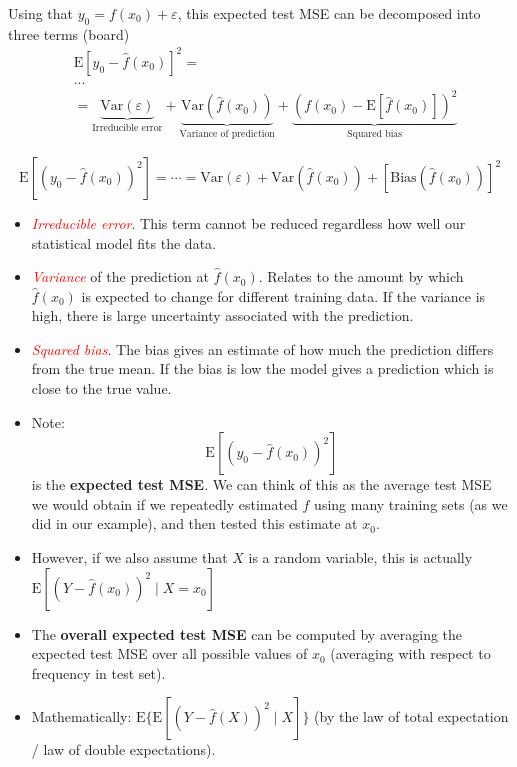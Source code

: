 \documentclass[ignorenonframetext,]{beamer}
\begin{document}
\begin{frame}

Using that \(y_0=f(x_0)+\varepsilon\), this expected test MSE can be
decomposed into three terms (board) \begin{align*}
&\text{E}[y_0 - \hat{f}(x_0)]^2 = \\
& ... \\
& =  \underbrace{\text{Var}(\varepsilon)}_{\text{Irreducible error}} + \underbrace{\text{Var}(\hat{f}(x_0))}_{\text{Variance of prediction}} + \underbrace{\left( f(x_0) - \text{E}[\hat{f}(x_0)] \right)^2}_{\text{Squared bias}}
\end{align*}

\end{frame}

\begin{frame}

\[\text{E}[(y_0 - \hat{f}(x_0))^2]=\cdots=\text{Var}(\varepsilon) +  \text{Var}(\hat{f}(x_0))+[\text{Bias}(\hat{f}(x_0))]^2\]

\begin{itemize}
\item
  \emph{\textcolor{red}{Irreducible error}}. This term cannot be reduced
  regardless how well our statistical model fits the data.
\item
  \emph{\textcolor{red}{Variance}} of the prediction at
  \(\hat{f}(x_0)\). Relates to the amount by which \(\hat{f}(x_0)\) is
  expected to change for different training data. If the variance is
  high, there is large uncertainty associated with the prediction.
\item
  \emph{\textcolor{red}{Squared bias}}. The bias gives an estimate of
  how much the prediction differs from the true mean. If the bias is low
  the model gives a prediction which is close to the true value.
\end{itemize}

\end{frame}

\begin{frame}

\begin{itemize}
\item
  Note: \[\text{E}[(y_0 - \hat{f}(x_0))^2]\] is the \textbf{expected
  test MSE}. We can think of this as the average test MSE we would
  obtain if we repeatedly estimated \(f\) using many training sets (as
  we did in our example), and then tested this estimate at \(x_0\).
\item
  However, if we also assume that \(X\) is a random variable, this is
  actually \(\text{E}[(Y - \hat{f}(x_0))^2 \mid X=x_0]\)
\item
  The \textbf{overall expected test MSE} can be computed by averaging
  the expected test MSE over all possible values of \(x_0\) (averaging
  with respect to frequency in test set).
\item
  Mathematically: \(\text{E} \{ \text{E}[(Y - \hat{f}(X))^2 \mid X]\}\)
  (by the law of total expectation / law of double expectations).
\end{itemize}

\end{frame}
\end{document}
